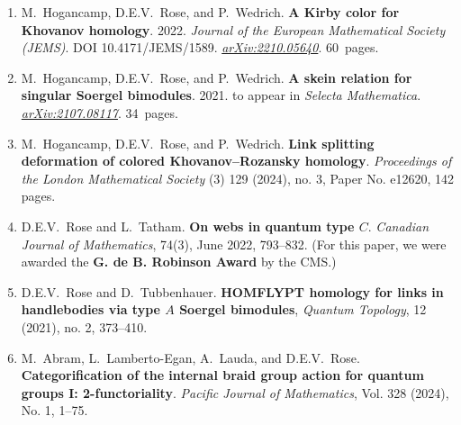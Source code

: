 \documentclass[10pt]{article}
\begin{document}
\begin{enumerate}

\item 
M.~Hogancamp, D.E.V.~Rose, and P.~Wedrich.
{\bf A Kirby color for Khovanov homology}.
2022.
\emph{Journal of the European Mathematical Society (JEMS)}.
DOI 10.4171/JEMS/1589.
\href{http://arxiv.org/abs/2210.05640}{\emph{arXiv:2210.05640}}.
60~pages.

\item
M.~Hogancamp, D.E.V.~Rose, and P.~Wedrich.
{\bf A skein relation for singular Soergel bimodules}.
2021.
to appear in \emph{Selecta Mathematica}.
\href{http://arxiv.org/abs/2107.08117}{\emph{arXiv:2107.08117}}.
34~pages.

\item 
M.~Hogancamp, D.E.V.~Rose, and P.~Wedrich.
{\bf Link splitting deformation of colored Khovanov--Rozansky homology}.
\emph{Proceedings of the London Mathematical Society}
(3) 129 (2024), no. 3, Paper No. e12620, 142 pages.

\item 
D.E.V.~Rose and L.~Tatham\textsuperscript{\textdagger}.
{\bf On webs in quantum type $C$}.
\emph{Canadian Journal of Mathematics}, 74(3), June 2022, 793--832.
(For this paper, we were awarded the \textbf{G. de B. Robinson Award} by the CMS.)

\item 
D.E.V.~Rose and D.~Tubbenhauer.
{\bf HOMFLYPT homology for links in handlebodies via type $A$ Soergel bimodules},
\emph{Quantum Topology}, 12 (2021), no. 2, 373--410. %

\item 
M.~Abram\textsuperscript{\textdagger}, L.~Lamberto-Egan\textsuperscript{\textdagger}, 
A.~Lauda, and D.E.V.~Rose.
{\bf Categorification of the internal braid group action for quantum groups I: 2-functoriality}. 
\emph{Pacific Journal of Mathematics},
Vol. 328 (2024), No. 1, 1--75.


\end{enumerate}
\end{document}
